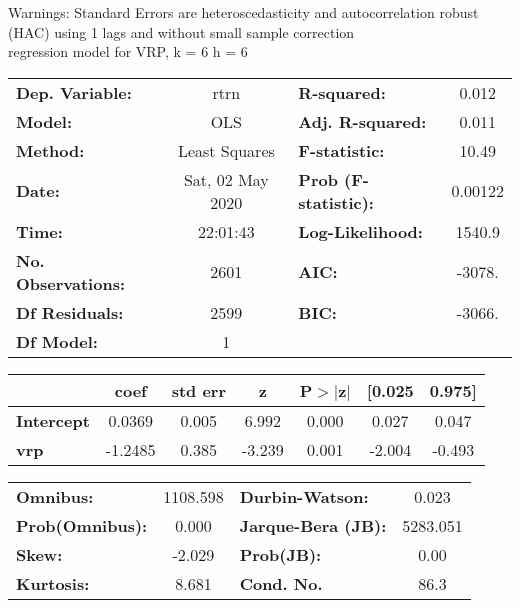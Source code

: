 Warnings: \newline
 [1] Standard Errors are heteroscedasticity and autocorrelation robust (HAC) using 1 lags and without small sample correction\\ 

regression model for VRP, k = 6 h = 6\begin{center}
\begin{tabular}{lclc}
\toprule
\textbf{Dep. Variable:}    &       rtrn       & \textbf{  R-squared:         } &     0.012   \\
\textbf{Model:}            &       OLS        & \textbf{  Adj. R-squared:    } &     0.011   \\
\textbf{Method:}           &  Least Squares   & \textbf{  F-statistic:       } &     10.49   \\
\textbf{Date:}             & Sat, 02 May 2020 & \textbf{  Prob (F-statistic):} &  0.00122    \\
\textbf{Time:}             &     22:01:43     & \textbf{  Log-Likelihood:    } &    1540.9   \\
\textbf{No. Observations:} &        2601      & \textbf{  AIC:               } &    -3078.   \\
\textbf{Df Residuals:}     &        2599      & \textbf{  BIC:               } &    -3066.   \\
\textbf{Df Model:}         &           1      & \textbf{                     } &             \\
\bottomrule
\end{tabular}
\begin{tabular}{lcccccc}
                   & \textbf{coef} & \textbf{std err} & \textbf{z} & \textbf{P$> |$z$|$} & \textbf{[0.025} & \textbf{0.975]}  \\
\midrule
\textbf{Intercept} &       0.0369  &        0.005     &     6.992  &         0.000        &        0.027    &        0.047     \\
\textbf{vrp}       &      -1.2485  &        0.385     &    -3.239  &         0.001        &       -2.004    &       -0.493     \\
\bottomrule
\end{tabular}
\begin{tabular}{lclc}
\textbf{Omnibus:}       & 1108.598 & \textbf{  Durbin-Watson:     } &    0.023  \\
\textbf{Prob(Omnibus):} &   0.000  & \textbf{  Jarque-Bera (JB):  } & 5283.051  \\
\textbf{Skew:}          &  -2.029  & \textbf{  Prob(JB):          } &     0.00  \\
\textbf{Kurtosis:}      &   8.681  & \textbf{  Cond. No.          } &     86.3  \\
\bottomrule
\end{tabular}
\end{center}

